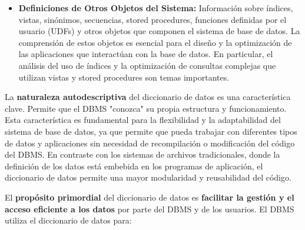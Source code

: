 \begin{itemize}
    \item \textbf{Definiciones de Otros Objetos del Sistema:}  Información sobre índices, vistas, sinónimos, secuencias, stored procedures, funciones definidas por el usuario (UDFs) y otros objetos que componen el sistema de base de datos.  La comprensión de estos objetos es esencial para el diseño y la optimización de las aplicaciones que interactúan con la base de datos.  En particular, el análisis del uso de índices y la optimización de consultas complejas que utilizan vistas y stored procedures son temas importantes.
\end{itemize}

La \textbf{naturaleza autodescriptiva} del diccionario de datos es una característica clave.  Permite que el DBMS "conozca" su propia estructura y funcionamiento.  Esta característica es fundamental para la flexibilidad y la adaptabilidad del sistema de base de datos, ya que permite que pueda trabajar con diferentes tipos de datos y aplicaciones sin necesidad de recompilación o modificación del código del DBMS.  En contraste con los sistemas de archivos tradicionales, donde la definición de los datos está embebida en los programas de aplicación, el diccionario de datos permite una mayor modularidad y reusabilidad del código.

El \textbf{propósito primordial} del diccionario de datos es \textbf{facilitar la gestión y el acceso eficiente a los datos} por parte del DBMS y de los usuarios.  El DBMS utiliza el diccionario de datos para:

